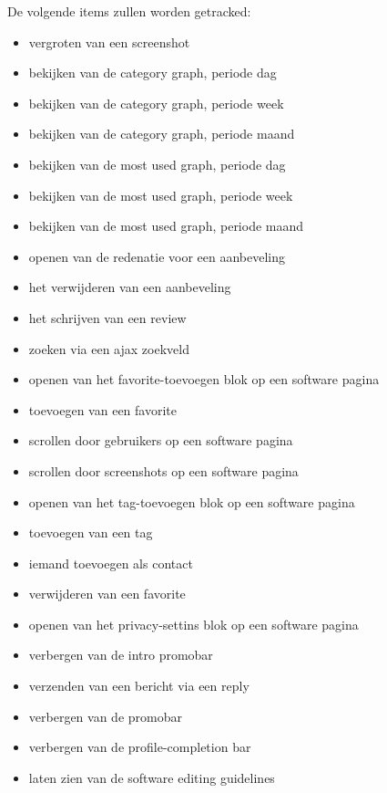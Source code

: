 \documentclass[a4paper, 10pt, pdftex]{report}
\begin{document}
     De volgende items zullen worden getracked:
     \begin{itemize}
     \item vergroten van een screenshot
     \item bekijken van de category graph, periode dag
     \item bekijken van de category graph, periode week
     \item bekijken van de category graph, periode maand
     \item bekijken van de most used graph, periode dag
     \item bekijken van de most used graph, periode week
     \item bekijken van de most used graph, periode maand
     \item openen van de redenatie voor een aanbeveling
     \item het verwijderen van een aanbeveling
     \item het schrijven van een review
     \item zoeken via een ajax zoekveld
     \item openen van het favorite-toevoegen blok op een software pagina
     \item toevoegen van een favorite
     \item scrollen door gebruikers op een software pagina
     \item scrollen door screenshots op een software pagina
     \item openen van het tag-toevoegen blok op een software pagina
     \item toevoegen van een tag
     \item iemand toevoegen als contact
     \item verwijderen van een favorite
     \item openen van het privacy-settins blok op een software pagina
     \item verbergen van de intro promobar
     \item verzenden van een bericht via een reply
     \item verbergen van de promobar
     \item verbergen van de profile-completion bar
     \item laten zien van de software editing guidelines
     \end{itemize}
\end{document}
